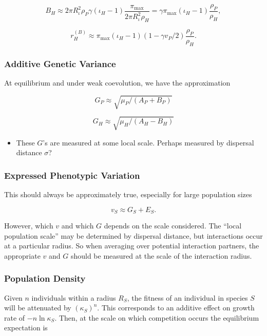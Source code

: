 \documentclass[
]{article}
\providecommand{\tightlist}{%
  \setlength{\itemsep}{0pt}\setlength{\parskip}{0pt}}
\begin{document}
\[B_H\approx 2\pi R_\iota^2\rho_P\gamma(\iota_H-1)\frac{\pi_{\max}}{2\pi R_\iota^2\rho_H}=\gamma\pi_{\max}(\iota_H-1)\frac{\rho_P}{\rho_H},\]

\[r_H^{(B)}\approx\pi_{\max}(\iota_H-1)(1-\gamma v_P/2)\frac{\rho_P}{\rho_H}.\]

\hypertarget{additive-genetic-variance}{%
\subsubsection{Additive Genetic
Variance}\label{additive-genetic-variance}}

At equilibrium and under weak coevolution, we have the approximation

\[G_P\approx \sqrt{\mu_P/(A_P+B_P)}\]

\[G_H\approx \sqrt{\mu_H/(A_H-B_H)}\]

\begin{itemize}
\tightlist
\item
  These \(G\)'s are measured at some local scale. Perhaps measured by
  dispersal distance \(\sigma\)?
\end{itemize}

\hypertarget{expressed-phenotypic-variation}{%
\subsubsection{Expressed Phenotypic
Variation}\label{expressed-phenotypic-variation}}

This should always be approximately true, especially for large
population sizes

\[v_S\approx G_S+E_S.\]

However, which \(v\) and which \(G\) depends on the scale considered.
The \enquote{local population scale} may be determined by dispersal
distance, but interactions occur at a particular radius. So when
averaging over potential interaction partners, the appropriate \(v\) and
\(G\) should be measured at the scale of the interaction radius.

\hypertarget{population-density}{%
\subsubsection{Population Density}\label{population-density}}

Given \(n\) individuals within a radius \(R_S\), the fitness of an
individual in species \(S\) will be attenuated by \((\kappa_S)^n\). This
corresponds to an additive effect on growth rate of \(-n\ln\kappa_S\).
Then, at the scale on which competition occurs the equilibrium
expectation is
\end{document}
